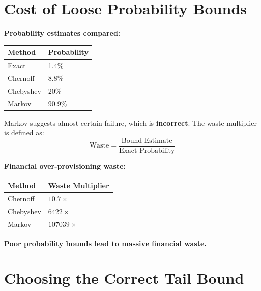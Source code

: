 \documentclass[12pt, a4paper]{article}
\begin{document}
\section{Cost of Loose Probability Bounds}

\textbf{Probability estimates compared:}
\begin{center}
\begin{tabular}{ll}
  \toprule
  \textbf{Method} & \textbf{Probability} \\
  \midrule
  Exact           & 1.4\%   \\
  Chernoff        & 8.8\%   \\
  Chebyshev       & 20\%    \\
  Markov          & 90.9\%  \\
  \bottomrule
\end{tabular}
\end{center}

Markov suggests almost certain failure, which is \textbf{incorrect}. The waste multiplier
is defined as:
\[
  \text{Waste} = \frac{\text{Bound Estimate}}{\text{Exact Probability}}
\]

\textbf{Financial over-provisioning waste:}
\begin{center}
\begin{tabular}{ll}
  \toprule
  \textbf{Method} & \textbf{Waste Multiplier} \\
  \midrule
  Chernoff        & $10.7\times$        \\
  Chebyshev       & $6422\times$        \\
  Markov          & $107039\times$      \\
  \bottomrule
\end{tabular}
\end{center}

\begin{tcolorbox}[colback=red!5, colframe=red!60!black]
  \textbf{Poor probability bounds lead to massive financial waste.}
\end{tcolorbox}

\section{Choosing the Correct Tail Bound}
\end{document}
